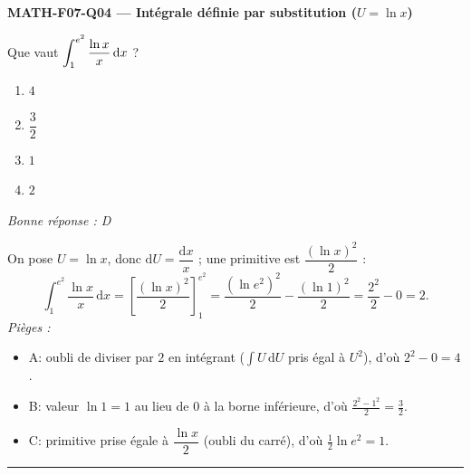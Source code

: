 \documentclass[11pt,a4paper]{article}
\begin{document}
\noindent\textbf{MATH-F07-Q04 --- Intégrale définie par substitution ($U=\ln x$)}\par
Que vaut $\displaystyle\int_{1}^{e^{2}} \dfrac{\ln x}{x}\,\mathrm{d}x$ ?
\begin{enumerate}[label=\Alph*)]
\item $4$
\item $\dfrac{3}{2}$
\item $1$
\item $2$
\end{enumerate}
\textit{Bonne réponse : D}\par
On pose $U=\ln x$, donc $\mathrm{d}U=\dfrac{\mathrm{d}x}{x}$ ; une primitive est $\dfrac{(\ln x)^{2}}{2}$ :
\[
\int_{1}^{e^{2}} \dfrac{\ln x}{x}\,\mathrm{d}x=\left[\dfrac{(\ln x)^{2}}{2}\right]_{1}^{e^{2}}
=\dfrac{(\ln e^{2})^{2}}{2}-\dfrac{(\ln 1)^{2}}{2}=\dfrac{2^{2}}{2}-0=2.
\]
\textit{Pièges :}
\begin{itemize}
\item A: oubli de diviser par $2$ en intégrant ($\int U\,\mathrm{d}U$ pris égal à $U^{2}$), d'où $2^{2}-0=4$.
\item B: valeur $\ln 1=1$ au lieu de $0$ à la borne inférieure, d'où $\tfrac{2^{2}-1^{2}}{2}=\tfrac32$.
\item C: primitive prise égale à $\dfrac{\ln x}{2}$ (oubli du carré), d'où $\tfrac12\ln e^{2}=1$.
\end{itemize}
\vspace{8pt}\hrule\vspace{8pt}
\end{document}
